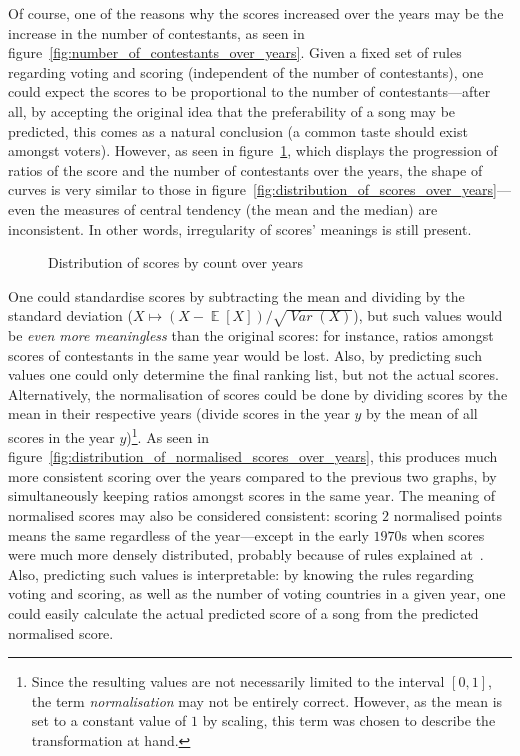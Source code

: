 \documentclass[conference, a4paper, 12pt]{IEEEtran}
\newcommand*{\intervalcc}[2]{\left[ {#1} , {#2} \right]}
\DeclareMathOperator{\expect}{\mathbb{E}}
\DeclareMathOperator{\Var}{\mathit{Var}}
\begin{document}
    \par

    Of course, one of the reasons why the scores increased over the years may be the increase in the number of contestants, as seen in figure~\ref{fig:number_of_contestants_over_years}. Given a fixed set of rules regarding voting and scoring (independent of the number of contestants), one could expect the scores to be proportional to the number of contestants---after all, by accepting the original idea that the preferability of a song may be predicted, this comes as a natural conclusion (a common taste should exist amongst voters). However, as seen in figure~\ref{fig:distribution_of_scores_by_count_over_years}, which displays the progression of ratios of the score and the number of contestants over the years, the shape of curves is very similar to those in figure~\ref{fig:distribution_of_scores_over_years}---even the measures of central tendency (the mean and the median) are inconsistent. In other words, irregularity of scores' meanings is still present.

    \par

    \begin{figure}[tbhp!]
        \centering
        
        \caption{Distribution of scores by count over years}
        \label{fig:distribution_of_scores_by_count_over_years}
    \end{figure}

    \par

    One could standardise scores by subtracting the mean and dividing by the standard deviation ($ X \mapsto \left( X - \expect \left[ X \right] \right) / \sqrt{\Var \left( X \right)} $), but such values would be \emph{even more meaningless} than the original scores: for instance, ratios amongst scores of contestants in the same year would be lost. Also, by predicting such values one could only determine the final ranking list, but not the actual scores. Alternatively, the normalisation of scores could be done by dividing scores by the mean in their respective years (divide scores in the year $ y $ by the mean of all scores in the year $ y $)\footnote{Since the resulting values are not necessarily limited to the interval $ \intervalcc{0}{1} $, the term \emph{normalisation} may not be entirely correct. However, as the mean is set to a constant value of $ 1 $ by scaling, this term was chosen to describe the transformation at hand.}. As seen in figure~\ref{fig:distribution_of_normalised_scores_over_years}, this produces much more consistent scoring over the years compared to the previous two graphs, by simultaneously keeping ratios amongst scores in the same year. The meaning of normalised scores may also be considered consistent: scoring $ 2 $ normalised points means the same regardless of the year---except in the early $ 1970 $s when scores were much more densely distributed, probably because of rules explained at~\cite{bib:EVWScores}. Also, predicting such values is interpretable: by knowing the rules regarding voting and scoring, as well as the number of voting countries in a given year, one could easily calculate the actual predicted score of a song from the predicted normalised score.
\end{document}
